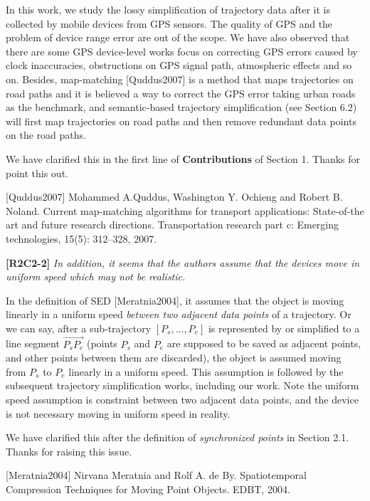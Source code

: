 \documentclass{letter}
\begin{document}
In this work, we study the lossy simplification of trajectory data after it is collected by mobile devices from GPS sensors. The quality of GPS and the problem of device range error are out of the scope. 
%
We have also observed that there are some GPS device-level works focus on correcting GPS errors caused by clock inaccuracies, obstructions on GPS signal path, atmospheric effects and so on. Besides, map-matching [Quddus2007] is a method that maps trajectories on road paths and it is believed a way to correct the GPS error taking urban roads as the benchmark, and semantic-based trajectory simplification (see Section 6.2) will first map trajectories on road paths and then remove redundant data points on the road paths.

We have clarified this in the first line of \textbf{Contributions} of Section 1. Thanks for point this out.


[Quddus2007] Mohammed A.Quddus, Washington Y. Ochieng and Robert B. Noland. Current map-matching algorithms for transport applications: State-of-the art and future research directions. {Transportation research part c: Emerging technologies}, 15(5): 312--328, 2007.

\textbf{[R2C2-2]} \emph{In addition, it seems that the authors assume that the devices move in uniform speed which may not be realistic.}

In the definition of SED [Meratnia2004], it assumes that the object is moving linearly in a uniform speed \textit{between two adjacent data points} of a trajectory. Or we can say, after a sub-trajectory $[P_s, ..., P_e]$ is represented by or simplified to a line segment $\overrightarrow{P_sP_e}$ (points $P_s$ and $P_e$ are supposed to be saved as adjacent points, and other points between them are discarded), the object is assumed moving from $P_s$ to $P_e$ linearly in a uniform speed. This assumption is followed by the subsequent trajectory simplification works, including our work. Note the uniform speed assumption is constraint between two adjacent data points, and the device is not necessary moving in uniform speed in reality.

We have clarified this after the definition of \emph{synchronized points} in Section 2.1. Thanks for raising this issue.

[Meratnia2004] Nirvana Meratnia and Rolf A. de By. Spatiotemporal Compression Techniques for Moving Point Objects. EDBT, 2004.
\end{document}

